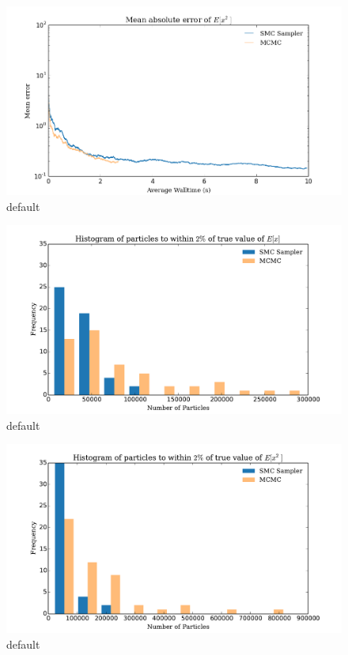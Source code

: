 \documentclass[12pt]{elsarticle}
\begin{document}
\begin{figure}[htbp]
\begin{center}
\includegraphics[width = \textwidth]{plots/E_X2_walltime.png}
\caption{default}
\label{default}
\end{center}
\end{figure}


\begin{figure}[htbp]
\begin{center}
\includegraphics[width = \textwidth]{plots/iterations.pdf}
\caption{default}
\label{default}
\end{center}
\end{figure}

\begin{figure}[htbp]
\begin{center}
\includegraphics[width = \textwidth]{plots/iterationsEx2.pdf}
\caption{default}
\label{default}
\end{center}
\end{figure}





\end{document}
